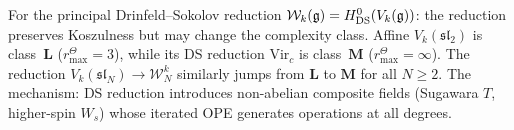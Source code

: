 \begin{remark}
For the principal Drinfeld--Sokolov reduction
$\mathcal{W}_k(\mathfrak{g}) = H^0_{\mathrm{DS}}(V_k(\mathfrak{g}))$:
the reduction preserves Koszulness but may change the
complexity class. Affine $V_k(\mathfrak{sl}_2)$ is
class~$\mathbf{L}$ (\(r^\Theta_{\max}=3\)), while its DS reduction
$\mathrm{Vir}_c$ is class~$\mathbf{M}$
(\(r^\Theta_{\max}=\infty\)).
The reduction $V_k(\mathfrak{sl}_N) \to \mathcal{W}_N^k$
similarly jumps from $\mathbf{L}$ to $\mathbf{M}$ for
all $N \geq 2$. The mechanism: DS reduction introduces
non-abelian composite fields (Sugawara $T$, higher-spin
$W_s$) whose iterated OPE generates operations at all
degrees.
\end{remark}

